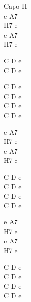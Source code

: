 \begin{chord}
    Capo II\\
    e A7\\
    H7 e\\
    e A7\\
    H7 e

    C D e\\
    C D e

    C D e\\
    C D e\\
    C D e\\
    C D e

    e A7\\
    H7 e\\
    e A7\\
    H7 e

    C D e\\
    C D e\\
    C D e\\
    C D e

    e A7\\
    H7 e\\
    e A7\\
    H7 e
    
    C D e\\
    C D e\\
    C D e\\
    C D e

\end{chord}
